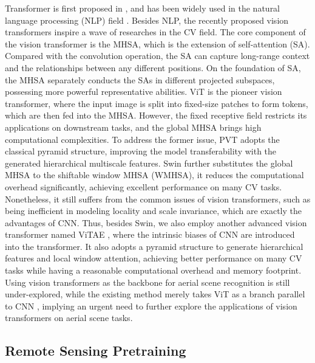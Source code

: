 \documentclass[10pt, journal,twoside]{IEEEtran}
\begin{document}
 Transformer is first proposed in \cite{selfattention}, and has been widely used in the natural language processing (NLP) field \cite{nlp_review1,vision_transformer_review}. Besides NLP, the recently proposed vision transformers inspire a wave of researches \cite{vit,deit,pvt,swint,xu2021vitae,vitae_v2,segformer,zj_detection1,zj_detection2,zj_detection3,zj_detection5} in the CV field. The core component of the vision transformer is the MHSA, which is the extension of self-attention (SA). Compared with the convolution operation, the SA can capture long-range context and the relationships between any different positions. On the foundation of SA, the MHSA separately conducts the SAs in different projected subspaces, possessing more powerful representative abilities. ViT \cite{vit} is the pioneer vision transformer, where the input image is split into fixed-size patches to form tokens, which are then fed into the MHSA. However, the fixed receptive field restricts its applications on downstream tasks, and the global MHSA brings high computational complexities. To address the former issue, PVT \cite{pvt} adopts the classical pyramid structure, improving the model transferability with the generated hierarchical multiscale features. Swin \cite{swint} further substitutes the global MHSA to the shiftable window MHSA (WMHSA), it reduces the computational overhead significantly, achieving excellent performance on many CV tasks. Nonetheless, it still suffers from the common issues of vision transformers, such as being inefficient in modeling locality and scale invariance, which are exactly the advantages of CNN. Thus, besides Swin, we also employ another advanced vision transformer named ViTAE \cite{xu2021vitae,vitae_v2}, where the intrinsic biases of CNN are introduced into the transformer. It also adopts a pyramid structure to generate hierarchical features and local window attention, achieving better performance on many CV tasks while having a reasonable computational overhead and memory footprint. Using vision transformers as the backbone for aerial scene recognition is still under-explored, while the existing method merely takes ViT as a branch parallel to CNN \cite{cnn_transformer_2022_asr}, implying an urgent need to further explore the applications of vision transformers on aerial scene tasks.

 \subsection{Remote Sensing Pretraining}
\end{document}
